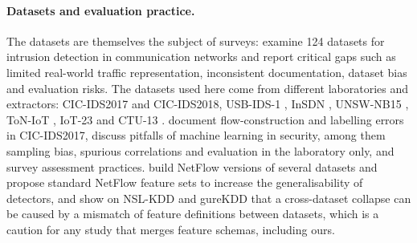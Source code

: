 \documentclass[pdflatex,sn-mathphys-num]{sn-jnl}%
\begin{document}
\paragraph{Datasets and evaluation practice.}
The datasets are themselves the subject of surveys: \citet{ashraf2026survey} examine 124 datasets for intrusion detection in communication networks and report critical gaps such as limited real-world traffic representation, inconsistent documentation, dataset bias and evaluation risks.
The datasets used here come from different laboratories and extractors: CIC-IDS2017 \citep{sharafaldin2018cicids} and CIC-IDS2018, USB-IDS-1 \citep{catillo2021usbids1,catillo2025usbidstc}, InSDN \citep{elsayed2020insdn}, UNSW-NB15 \citep{moustafa2015unsw}, ToN-IoT \citep{alsaedi2020toniot}, IoT-23 \citep{garcia2020iot23} and CTU-13 \citep{garcia2014ctu13}.
\citet{engelen2021troubleshooting} document flow-construction and labelling errors in CIC-IDS2017, \citet{arp2022dos} discuss pitfalls of machine learning in security, among them sampling bias, spurious correlations and evaluation in the laboratory only, and \citet{apruzzese2023sok} survey assessment practices.
\citet{sarhan2021netflow,sarhan2022standard,sarhan2022evaluating} build NetFlow versions of several datasets and propose standard NetFlow feature sets to increase the generalisability of detectors, and \citet{alriyami2021cross} show on NSL-KDD and gureKDD that a cross-dataset collapse can be caused by a mismatch of feature definitions between datasets, which is a caution for any study that merges feature schemas, including ours.
\end{document}
